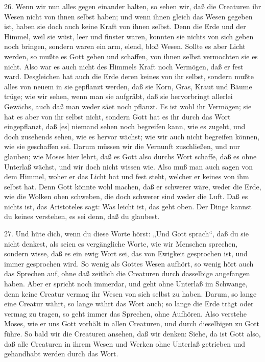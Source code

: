 26. Wenn wir nun alles gegen einander halten, so sehen wir, daß die Creaturen ihr Wesen nicht von ihnen selbst haben; und wenn ihnen gleich das Wesen gegeben ist, haben sie doch auch keine Kraft von ihnen selbst. Denn die Erde und der Himmel, weil sie wüst, leer und finster waren, konnten sie nichts von sich geben noch bringen, sondern waren ein arm, elend, bloß Wesen. Sollte es aber Licht werden, so mußte es Gott geben und schaffen, von ihnen selbst vermochten sie es nicht. Also war es auch nicht des Himmels Kraft noch Vermögen, daß er fest ward. Desgleichen hat auch die Erde deren keines von ihr selbst, sondern mußte alles von neuem in sie gepflanzt werden, daß sie Korn, Gras, Kraut und Bäume trüge; wie wir sehen, wenn man sie aufgräbt, daß sie hervorbringt allerlei Gewächs, auch daß man weder säet noch pflanzt. Es ist wohl ihr Vermögen; sie hat es aber von ihr selbst nicht, sondern Gott hat es ihr durch das Wort eingepflanzt, daß [es] niemand sehen noch begreifen kann, wie es zugeht, und doch zusehends sehen, wie es hervor wächst; wie wir auch nicht begreifen können, wie sie geschaffen sei. Darum müssen wir die Vernunft zuschließen, und nur glauben; wie Moses hier lehrt, daß es Gott also durchs Wort schaffe, daß es ohne Unterlaß wächst, und wir doch nicht wissen wie. Also muß man auch sagen von dem Himmel, woher er das Licht hat und fest steht, welcher er keines von ihm selbst hat. Denn Gott könnte wohl machen, daß er schwerer wäre, weder die Erde, wie die Wolken oben schweben, die doch schwerer sind weder die Luft. Daß es nichts ist, das Aristoteles sagt: Was leicht ist, das geht oben. Der Dinge kannst du keines verstehen, es sei denn, daß du glaubest.

27. Und hüte dich, wenn du diese Worte hörst: „Und Gott sprach“, daß du sie nicht denkest, als seien es vergängliche Worte, wie wir Menschen sprechen, sondern wisse, daß es ein ewig Wort sei, das von Ewigkeit gesprochen ist, und immer gesprochen wird. So wenig als Gottes Wesen aufhört, so wenig hört auch das Sprechen auf, ohne daß zeitlich die Creaturen durch dasselbige angefangen haben. Aber er spricht noch immerdar, und geht ohne Unterlaß im Schwange, denn keine Creatur vermag ihr Wesen von sich selbst zu haben. Darum, so lange eine Creatur währt,
so lange währt das Wort auch; so lange die Erde trägt oder vermag zu tragen, so geht immer das Sprechen, ohne Aufhören. Also verstehe Moses, wie er uns Gott vorhält in allen Creaturen, und durch dieselbigen zu Gott führe. So bald wir die Creaturen ansehen, daß wir denken: Siehe, da ist Gott also, daß alle Creaturen in ihrem Wesen und Werken ohne Unterlaß getrieben und gehandhabt werden durch das Wort.

